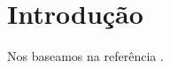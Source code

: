 \documentclass[../dissertacao]{subfiles}
\begin{document}
\chapter{Introdução}

Nos baseamos na referência \cite{conway}.

\lipsum
\end{document}
